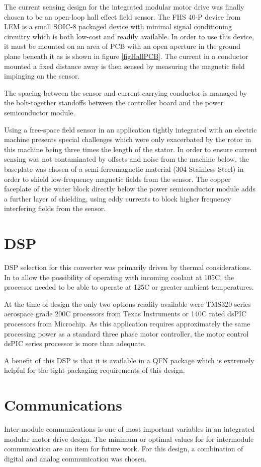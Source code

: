 The current sensing design for the integrated modular motor drive was finally
chosen to be an open-loop hall effect field sensor.
The FHS 40-P device from LEM is a small SOIC-8 packaged device with minimal
signal conditioning circuitry which is both low-cost and readily available.
In order to use this device, it must be mounted on an area of PCB with an open
aperture in the ground plane beneath it as is shown in figure
\ref{figHallPCB}.
The current in a conductor mounted a fixed distance away is then sensed by
measuring the magnetic field impinging on the sensor.

The spacing between the sensor and current carrying conductor is managed by
the bolt-together standoffs between the controller board and the power
semiconductor module.

Using a free-space field sensor in an application tightly integrated with an
electric machine presents special challenges which were only exacerbated by
the rotor in this machine being three times the length of the stator.
In order to ensure current sensing was not contaminated by offsets and noise
from the machine below, the baseplate was chosen of a semi-ferromagnetic
material (304 Stainless Steel) in order to shield low-frequency magnetic
fields from the sensor.
The copper faceplate of the water block directly below the power semiconductor
module adds a further layer of shielding, using eddy currents to block higher
frequency interfering fields from the sensor.

\section{DSP}
DSP selection for this converter was primarily driven by thermal
considerations. In to allow the possibility of operating with incoming coolant
at 105C, the processor needed to be able to operate at 125C or greater ambient
temperatures.

At the time of design the only two options readily available were
TMS320-series aerospace grade 200C processors from Texas Instruments or 140C
rated dsPIC processors from Microchip. As this application requires
approximately the same processing power as a standard three phase motor
controller, the motor control dsPIC series processor is more than adequate.

A benefit of this DSP is that it is available in a QFN package which is
extremely helpful for the tight packaging requirements of this design.

\section{Communications}
Inter-module communications is one of most important variables in an
integrated modular motor drive design. The minimum or optimal values for
for intermodule communication are an item for future work. For this design, a
combination of digital and analog communication was chosen.

